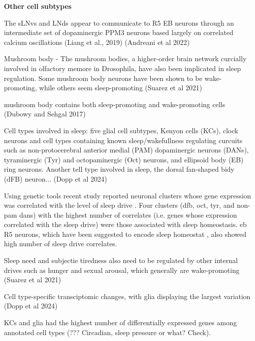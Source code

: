 \textbf{Other cell subtypes}

The sLNvs and LNds appear to communicate to R5 EB neurons through an intermediate set of dopaminergic PPM3 neurons based largely on correlated calcium oscillations (Liang et al., 2019)
\parencite{andreaniCircadianProgrammingEllipsoid2022} (Andreani et al 2022)

Mushroom body - The mushroom bodies, a higher-order brain
network curcially involved in olfactory memore in Drosophila, have
also been implicated in sleep regulation. Some mushroom body neurons have been
shown to be wake-promoting, while others seem sleep-promoting \parencite{suarez-grimaltNeuralArchitectureSleep2021}
(Suarez et al 2021)

mushroom body contains both sleep-promoting and wake-promoting cells
\parencite{dubowyCircadianRhythmsSleep2017} (Dubowy and Sehgal 2017)

Cell types involved in sleep: five glial cell subtypes, Kenyon cells (KCs), clock neurons and cell types containing
known sleep/wakefullness regulating curcuits such as non-protocerebral anterior medial (PAM) dopaminergic neurons (DANs),
tyraminergic (Tyr) and octopaminergic (Oct) neurons, and ellipsoid body (EB) ring neurons. Another tell type involved in sleep,
the dorsal fan-shaped bidy (dFB) neuron... \parencite{doppSinglecellTranscriptomicsReveals2024}
(Dopp et al 2024)

Using genetic tools recent study reported neuronal clusters whose gene expression was
correlated with the level of sleep drive
\parencite{doppSinglecellTranscriptomicsReveals2024}. Four clusters (\gls{dfb}, \gls{oct}, \gls{tyr}, and non-\gls{pam} \glspl{dan}) with the highest number of
correlates (i.e. genes whose expression correlated with the sleep drive) were those associated
with sleep homeostasis. \gls{eb} R5 neurons, which have been suggested to encode sleep homeostat \parencite{liuSleepDriveEncoded2016}, also showed high number
of sleep drive correlates.

Sleep need and subjectie tiredness also need to be regulated by other internal drives such as hunger and sexual arousal,
which generally are wake-promoting \parencite{suarez-grimaltNeuralArchitectureSleep2021}
(Suarez et al 2021)

Cell type-specific transciptomic changes, with glia displaying the largest variation \parencite{doppSinglecellTranscriptomicsReveals2024}
(Dopp et al 2024)

KCs and glia had the highest number of differentially expressed genes among
annotated cell types (??? Circadian, sleep pressure or what? Check).

